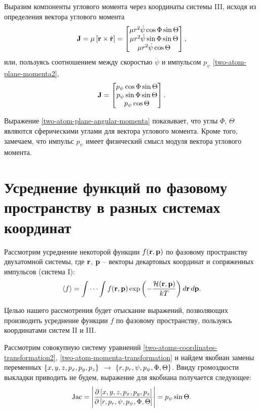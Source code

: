 Выразим компоненты углового момента через координаты системы III, исходя из определения вектора углового момента 
\begin{gather}
    \mathbf{J} = \mu \left[ \mathbf{r} \times \dot{\mathbf{r}} \right] = 
    \begin{bmatrix}
        \mu r^2 \dot{\psi} \cos \Phi \sin \Theta \\ 
        \mu r^2 \dot{\psi} \sin \Phi \sin \Theta \\
        \mu r^2 \dot{\psi} \cos \Theta
    \end{bmatrix},
\end{gather}
или, пользуясь соотношением между скоростью $\dot{\psi}$ и импульсом $p_\psi$ \eqref{two-atom-plane-momenta2}, 
\begin{gather}
    \mathbf{J} = 
    \begin{bmatrix}
        p_\psi \cos \Phi \sin \Theta \\
        p_\psi \sin \Phi \sin \Theta \\
        p_\psi \cos \Theta
    \end{bmatrix}. \label{two-atom-plane-angular-momenta}
\end{gather}

Выражение \eqref{two-atom-plane-angular-momenta} показывает, что углы $\Phi$, $\Theta$ являются сферическими углами для вектора углового момента. Кроме того, замечаем, что импульс $p_\psi$ имеет физический смысл модуля вектора углового момента. 

\section{Усреднение функций по фазовому пространству в разных системах координат} \label{section:averaging}

Рассмотрим усреднение некоторой функции $f(\mathbf{r}, \mathbf{p})$ по фазовому пространству двухатомной системы, где $\mathbf{r}$, $\mathbf{p}$ -- векторы декартовых координат и сопряженных импульсов (система I): 
\begin{gather}
    \langle f \rangle = \idotsint f(\mathbf{r}, \mathbf{p}) \exp \left( -\frac{\mathcal{H}(\mathbf{r},\mathbf{p})}{kT} \right) d \mathbf{r} \, d\mathbf{p}. \label{two-atom-mean}
\end{gather}

Целью нашего рассмотрения будет отыскание выражений, позволяющих производить усреднение функции $f$ по фазовому пространству, пользуясь координатами систем II и III. \par
Рассмотрим совокупную систему уравнений \eqref{two-atoms-coordinates-transformation2}, \eqref{two-atom-momenta-transformation} и найдем якобиан замены переменных $\left\{ x, y, z, p_x, p_y, p_z \right\}$ $\rightarrow$ $\left\{ r, p_r, \psi, p_\psi, \Phi, \Theta \right\}$. Ввиду громоздкости выкладки приводить не будем, выражение для якобиана получается следующее:
\begin{gather}
    \text{Jac} = \Bigg\vert \frac{\partial \left[ x, y, z, p_x, p_y, p_z \right]}{\partial \left[ r, p_r, \psi, p_\psi, \Phi, \Theta \right]} \Bigg\vert = p_\psi \sin \Theta. \label{two-atom-planar-jacobian}
\end{gather}

